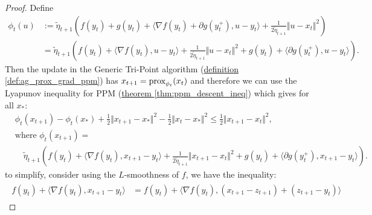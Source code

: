 \documentclass[12pt]{article}
\begin{document}
        \begin{proof}
            Define 
            \begin{align*}
                \phi_t(u) &:= 
                \tilde \eta_{t + 1} 
                \left(
                    f(y_t) + g(y_t) + \langle \nabla f(y_t) + \partial g(y_t^+), u - y_t\rangle
                    + 
                    \frac{1}{2\tilde \eta_{t + 1}}\Vert u - x_t\Vert^2
                \right)\\
                &= 
                \tilde \eta_{t + 1} \left(
                    f(y_t) + \langle \nabla f(y_t), u - y_t\rangle + 
                    \frac{1}{2\tilde \eta_{t + 1}}\Vert u - x_t\Vert^2
                    + 
                    g(y_t) + \langle \partial g(y_t^+), u - y_t\rangle
                \right). 
            \end{align*}
            Then the update in the Generic Tri-Point algorithm 
            (\hyperref[def:ag_prox_grad_ppm]
                {definition \ref*{def:ag_prox_grad_ppm}}) 
            has $x_{t + 1} = \operatorname{prox}_{\phi_t}(x_t)$ and therefore we can use the Lyapunov inequality for PPM (\hyperref[thm:ppm_descent_ineq]
                {theorem \ref*{thm:ppm_descent_ineq}})
            which gives for all $x_*$: 
            \begin{align*}
                & \phi_t(x_{t + 1}) - \phi_t(x_*) + 
                \frac{1}{2}\Vert x_{t+1} - x_*\Vert^2 - 
                \frac{1}{2}\Vert x_t - x_*\Vert^2
                \le \frac{1}{2}\Vert x_{t + 1} - x_t\Vert^2, 
                \\
                & \text{where }
                \phi_t(x_{t + 1}) =
                \\
                & \quad 
                \tilde \eta_{t + 1}
                \left(
                    f(y_t) + \langle \nabla f(y_t), x_{t + 1} - y_t\rangle + 
                    \frac{1}{2\tilde \eta_{t + 1}}\Vert x_{t + 1} - x_t\Vert^2
                    + 
                    g(y_t) + \langle \partial g(y_t^+), x_{t + 1} - y_t\rangle
                \right). 
            \end{align*}
            to simplify, consider using the $L$-smoothness of $f$, we have the inequality: 
            \begin{align*}
                \begin{aligned}
                    f(y_t) + \langle \nabla f(y_t), x_{t + 1} - y_t\rangle
                    &=
                    f(y_t) + \langle \nabla f(y_t), (x_{t +1} - z_{t + 1}) + (z_{t + 1} - y_t) \rangle

\end{aligned}
\end{align*}
\end{proof}
\end{document}
